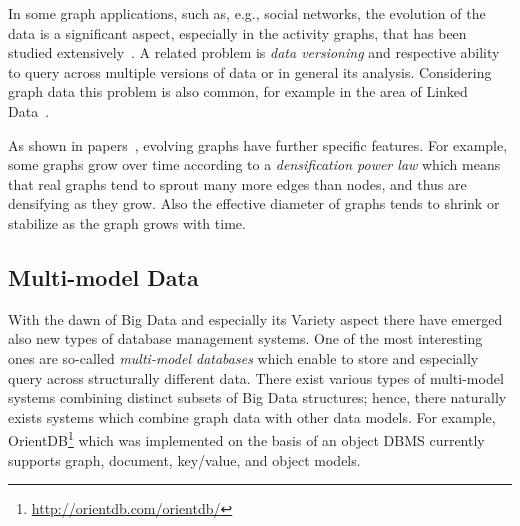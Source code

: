In some graph applications, such as, e.g., social networks, the evolution of the data is a significant aspect, especially in the activity graphs, that has been studied extensively~\cite{doreian1997evolution,Kumar:2006:SEO:1150402.1150476,Hellmann2014583,wang2013,Kossinets88,Viswanath:2009:EUI:1592665.1592675}.  A related problem is \emph{data versioning} and respective ability to query across multiple versions of data or in general its analysis. Considering graph data this problem is also common, for example  in the area of Linked Data~\cite{DBLP:conf/semweb/Papakonstantinou16,DBLP:conf/esws/MeimarisP16,fernandez2015towards,fernandez2015bear}.

As shown in papers~\cite{Leskovec:2005:RMT:2101235.2101254,Leskovec:2005:GOT:1081870.1081893}, evolving graphs have further specific features. For example, some graphs grow over time according to a \emph{densification power law} which means that real graphs tend to sprout many more edges than nodes, and thus are densifying as they grow. Also the effective diameter of graphs tends to shrink or stabilize as the graph grows with time.



\subsection{Multi-model Data}
With the dawn of Big Data and especially its Variety aspect there have emerged also new types of database management systems. One of the most interesting ones are so-called \emph{multi-model databases} which enable to store and especially query across structurally different data. There exist various types of multi-model systems combining  distinct subsets of Big Data structures; hence, there naturally exists systems which combine graph data with other data models. For example, OrientDB\footnote{\url{http://orientdb.com/orientdb/}} which was implemented on the basis of an object DBMS currently supports graph, document, key/value, and object models.

